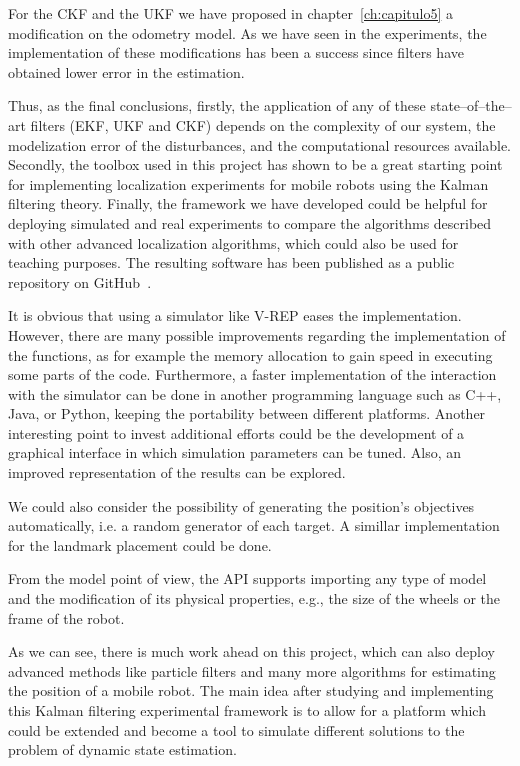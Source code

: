 For the \ac{CKF} and the \ac{UKF} we have proposed in chapter~\ref{ch:capitulo5} a modification on the odometry model.
As we have seen in the experiments, the implementation of these modifications has been a success since filters have obtained lower error in the estimation.

Thus, as the final conclusions, firstly, the application of any of these state--of--the--art filters (\ac{EKF}, \ac{UKF} and \ac{CKF}) depends on the complexity of our system, the modelization error of the disturbances, and the computational resources available.
Secondly, the toolbox used in this project has shown to be a great starting point for implementing localization experiments for mobile robots using the Kalman filtering theory.
Finally, the framework we have developed could be helpful for deploying simulated and real experiments to compare the algorithms described with other advanced localization algorithms, which could also be used for teaching purposes.
The resulting software has been published as a public repository on GitHub~\cite{_tfg_repo}.


It is obvious that using a simulator like V-REP eases the implementation.
However, there are many possible improvements regarding the implementation of the functions, as for example the memory allocation to gain speed in executing some parts of the code.
Furthermore, a faster implementation of the interaction with the simulator can be done in another programming language such as C++, Java, or Python, keeping the portability between different platforms.
Another interesting point to invest additional efforts could be the development of a graphical interface in which simulation parameters can be tuned.
Also, an improved representation of the results can be explored.

We could also consider the possibility of generating the position's objectives automatically, i.e. a random generator of each target.
A simillar implementation for the landmark placement could be done.

From the model point of view, the API supports importing any type of model and the modification of its physical properties, e.g., the size of the wheels or the frame of the robot.

As we can see, there is much work ahead on this project, which can also deploy advanced methods like particle filters and many more algorithms for estimating the position of a mobile robot.
The main idea after studying and implementing this Kalman filtering experimental framework is to allow for a platform which could be extended and become a tool to simulate different solutions to the problem of dynamic state estimation.

